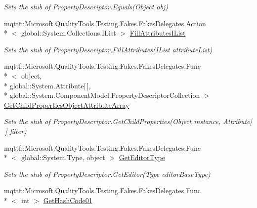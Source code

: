 \begin{DoxyCompactItemize}
\begin{DoxyCompactList}\small\item\em Sets the stub of Property\-Descriptor.\-Equals(\-Object obj)\end{DoxyCompactList}\item 
mqttf\-::\-Microsoft.\-Quality\-Tools.\-Testing.\-Fakes.\-Fakes\-Delegates.\-Action\\*
$<$ global\-::\-System.\-Collections.\-I\-List $>$ \hyperlink{class_system_1_1_component_model_1_1_fakes_1_1_stub_property_descriptor_a66cfa436a03d8f4762ecef9d96bd259c}{Fill\-Attributes\-I\-List}
\begin{DoxyCompactList}\small\item\em Sets the stub of Property\-Descriptor.\-Fill\-Attributes(\-I\-List attribute\-List)\end{DoxyCompactList}\item 
mqttf\-::\-Microsoft.\-Quality\-Tools.\-Testing.\-Fakes.\-Fakes\-Delegates.\-Func\\*
$<$ object, \\*
global\-::\-System.\-Attribute\mbox{[}$\,$\mbox{]}, \\*
global\-::\-System.\-Component\-Model.\-Property\-Descriptor\-Collection $>$ \hyperlink{class_system_1_1_component_model_1_1_fakes_1_1_stub_property_descriptor_aaffcf6f83e8e96ee77e105b9b721bf0a}{Get\-Child\-Properties\-Object\-Attribute\-Array}
\begin{DoxyCompactList}\small\item\em Sets the stub of Property\-Descriptor.\-Get\-Child\-Properties(\-Object instance, Attribute\mbox{[}$\,$\mbox{]} filter)\end{DoxyCompactList}\item 
mqttf\-::\-Microsoft.\-Quality\-Tools.\-Testing.\-Fakes.\-Fakes\-Delegates.\-Func\\*
$<$ global\-::\-System.\-Type, object $>$ \hyperlink{class_system_1_1_component_model_1_1_fakes_1_1_stub_property_descriptor_a45f009053c80d442d34ccd29fa3044c9}{Get\-Editor\-Type}
\begin{DoxyCompactList}\small\item\em Sets the stub of Property\-Descriptor.\-Get\-Editor(\-Type editor\-Base\-Type)\end{DoxyCompactList}\item 
mqttf\-::\-Microsoft.\-Quality\-Tools.\-Testing.\-Fakes.\-Fakes\-Delegates.\-Func\\*
$<$ int $>$ \hyperlink{class_system_1_1_component_model_1_1_fakes_1_1_stub_property_descriptor_a9fe4549f2cc975180c8a41b08afacc24}{Get\-Hash\-Code01}

\end{DoxyCompactItemize}
